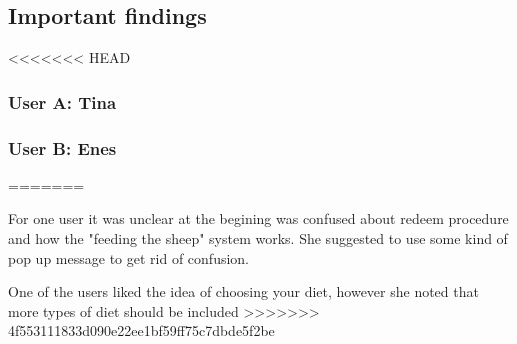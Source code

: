 \subsection{Important findings}
<<<<<<< HEAD
\subsubsection{User A: Tina}




\subsubsection{User B: Enes}
=======
 \item For one user it was unclear at the begining was confused about redeem procedure and how the "feeding the sheep" system
works. She suggested to use some kind of pop up message to get rid of confusion.
 \item One of the users liked the idea of choosing your diet, however she noted that more types of diet should be included
>>>>>>> 4f553111833d090e22ee1bf59ff75c7dbde5f2be
